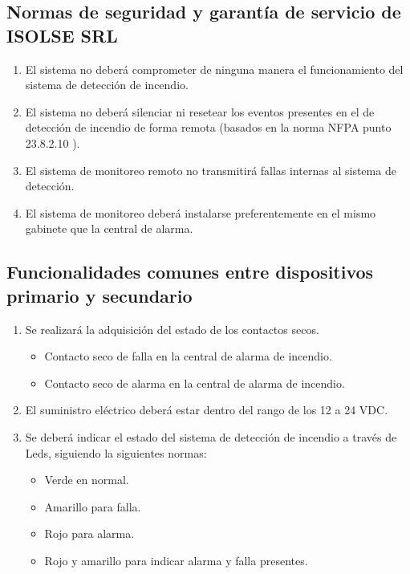 \subsection{Normas de seguridad y garantía de servicio de ISOLSE SRL}
	\begin{enumerate}
	\item El sistema no deberá comprometer de ninguna manera el funcionamiento del sistema de detección de incendio.
	\item El sistema no deberá silenciar ni resetear los eventos presentes en el de detección de incendio de forma remota (basados en la norma NFPA punto 23.8.2.10 \cite{nfpa}). 
	\item El sistema de monitoreo remoto no transmitirá fallas internas al sistema de detección.
	\item El sistema de monitoreo deberá instalarse preferentemente en el mismo gabinete que la central de alarma.
	\end{enumerate}
	
\subsection{Funcionalidades comunes entre dispositivos primario y secundario}
	\begin{enumerate}
	\item Se realizará la adquisición del estado de los contactos secos.
		\begin{itemize}
		\item Contacto seco de falla en la central de alarma de incendio.
		\item Contacto seco de alarma en la central de alarma de incendio.
		\end{itemize}
	\item El suministro eléctrico deberá estar dentro del rango de los 12 a 24 VDC.
	\item Se deberá indicar el estado del sistema de detección de incendio a través de Leds, siguiendo la siguientes normas:
		\begin{itemize}
		\item  Verde en normal.
		\item  Amarillo para falla.
		\item  Rojo para alarma.
		\item  Rojo y amarillo para indicar alarma y falla presentes.				
		\end{itemize}
	\end{enumerate}
	
